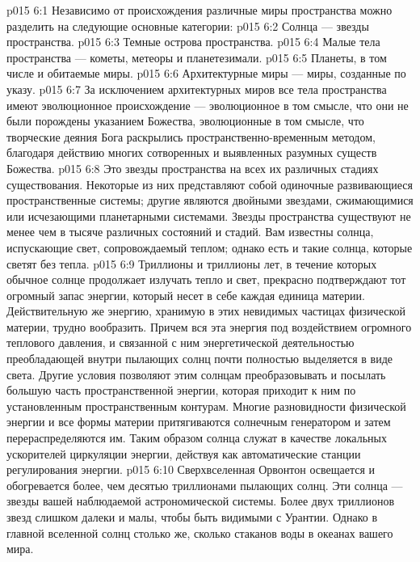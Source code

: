 \vs p015 6:1 Независимо от происхождения различные миры пространства можно разделить на следующие основные категории:
\vs p015 6:2 \bibnobreakspace Солнца --- звезды пространства.
\vs p015 6:3 \bibnobreakspace Темные острова пространства.
\vs p015 6:4 \bibnobreakspace Малые тела пространства --- кометы, метеоры и планетезимали.
\vs p015 6:5 \bibnobreakspace Планеты, в том числе и обитаемые миры.
\vs p015 6:6 \bibnobreakspace Архитектурные миры --- миры, созданные по указу.
\vs p015 6:7 \pc За исключением архитектурных миров все тела пространства имеют эволюционное происхождение --- эволюционное в том смысле, что они не были порождены указанием Божества, эволюционные в том смысле, что творческие деяния Бога раскрылись пространственно\hyp{}временным методом, благодаря действию многих сотворенных и выявленных разумных существ Божества.
\vs p015 6:8 \pc {} Это звезды пространства на всех их различных стадиях существования. Некоторые из них представляют собой одиночные развивающиеся пространственные системы; другие являются двойными звездами, сжимающимися или исчезающими планетарными системами. Звезды пространства существуют не менее чем в тысяче различных состояний и стадий. Вам известны солнца, испускающие свет, сопровождаемый теплом; однако есть и такие солнца, которые светят без тепла.
\vs p015 6:9 Триллионы и триллионы лет, в течение которых обычное солнце продолжает излучать тепло и свет, прекрасно подтверждают тот огромный запас энергии, который несет в себе каждая единица материи. Действительную же энергию, хранимую в этих невидимых частицах физической материи, трудно вообразить. Причем вся эта энергия под воздействием огромного теплового давления, и связанной с ним энергетической деятельностью преобладающей внутри пылающих солнц почти полностью выделяется в виде света. Другие условия позволяют этим солнцам преобразовывать и посылать большую часть пространственной энергии, которая приходит к ним по установленным пространственным контурам. Многие разновидности физической энергии и все формы материи притягиваются солнечным генератором и затем перераспределяются им. Таким образом солнца служат в качестве локальных ускорителей циркуляции энергии, действуя как автоматические станции регулирования энергии.
\vs p015 6:10 Сверхвселенная Орвонтон освещается и обогревается более, чем десятью триллионами пылающих солнц. Эти солнца --- звезды вашей наблюдаемой астрономической системы. Более двух триллионов звезд слишком далеки и малы, чтобы быть видимыми с Урантии. Однако в главной вселенной солнц столько же, сколько стаканов воды в океанах вашего мира.
